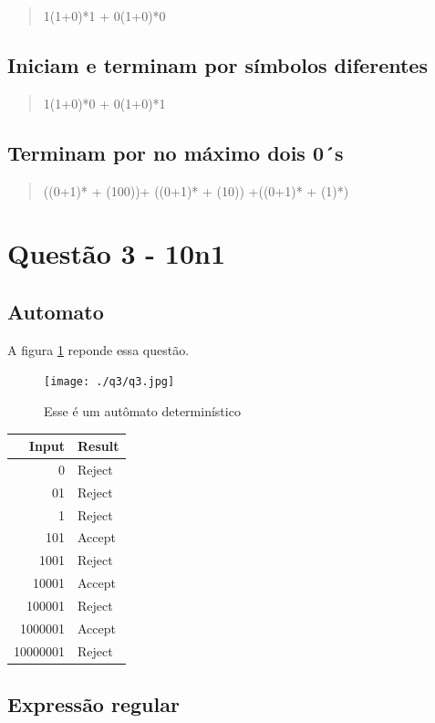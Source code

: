 \documentclass[11pt]{article}
\begin{document}
\begin{quote}
1(1+0)*1 + 0(1+0)*0 
\end{quote}

\subsection{Iniciam e terminam por símbolos diferentes}
\label{sec:org515121c}

\begin{quote}
1(1+0)*0 + 0(1+0)*1 
\end{quote}

\subsection{Terminam por no máximo dois 0´s}
\label{sec:org3783ed3}
\begin{quote}
((0+1)* + (100))+ ((0+1)* + (10)) +((0+1)* + (1)*)
\end{quote}
\pagebreak
\section{Questão 3 - 10n1}
\label{sec:orgc03906d}
\subsection{Automato}
\label{sec:org3555b5c}
A figura \ref{fig:org9e82aa8} reponde essa questão. 

\begin{figure}[htbp]
\centering
\texttt{[image: ./q3/q3.jpg]}
\caption{\label{fig:org9e82aa8}
Esse é um autômato determinístico}
\end{figure}

\begin{center}
\begin{tabular}{rl}
Input & Result\\
\hline
0 & Reject\\
01 & Reject\\
1 & Reject\\
101 & Accept\\
1001 & Reject\\
10001 & Accept\\
100001 & Reject\\
1000001 & Accept\\
10000001 & Reject\\
\end{tabular}
\end{center}
\subsection{Expressão regular}
\label{sec:orgcbaf11e}
\end{document}
